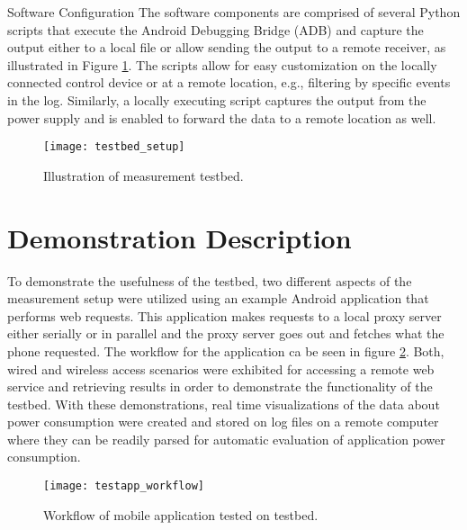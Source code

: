 {Software Configuration}
The software components are comprised of several Python scripts that execute the Android Debugging Bridge (ADB) and capture the output either to a local file or allow sending the output to a remote receiver, as illustrated in  Figure \ref{fig:testbed_setup}. The scripts allow for easy customization on the locally connected control device or at a remote location, e.g., filtering by specific events in the log. Similarly, a locally executing script captures the output from the power supply and is enabled to forward the data to a remote location as well.

\begin{figure}
\centering
\texttt{[image: testbed\_setup]}
\caption{Illustration of measurement testbed.}
\label{fig:testbed_setup}
\end{figure}

\section*{Demonstration Description}
To demonstrate the usefulness of the testbed, two different aspects of the measurement setup were utilized using an example Android application that performs web requests. This application makes requests to a local proxy server either serially or in parallel and the proxy server goes out and fetches what the phone requested.  The workflow for the application ca be seen in figure \ref{fig:testapp_workflow}. Both, wired and wireless access scenarios were exhibited for accessing a remote web service and retrieving results in order to demonstrate the functionality of the testbed. With these demonstrations, real time visualizations of the data about power consumption were created and stored on log files on a remote computer where they can be readily parsed for automatic evaluation  of application power consumption.

\begin{figure}
\centering
\texttt{[image: testapp\_workflow]}
\caption{Workflow of mobile application tested on testbed.}
\label{fig:testapp_workflow}
\end{figure}
